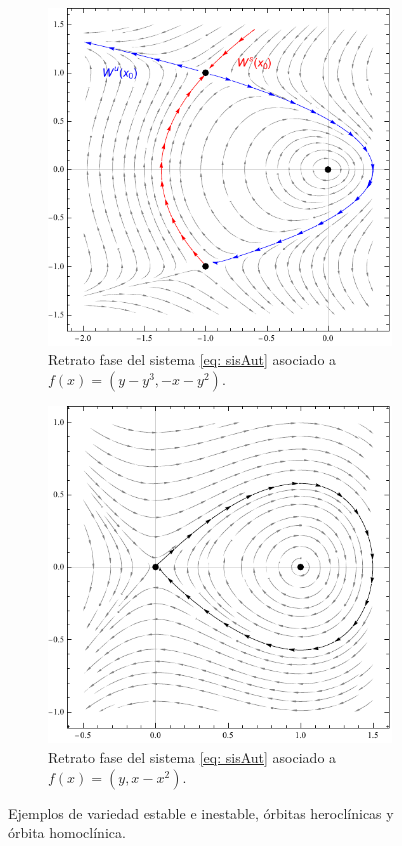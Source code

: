 \begin{figure} %
	\centering
	\begin{subfigure}{0.49\textwidth}
		\includegraphics[width=\textwidth]{img/Heteroclinic.pdf}
		\caption{Retrato fase del sistema \eqref{eq: sisAut} asociado a $f(x) = (y-y^3, -x-y^2)$.}
		\label{fig: heteroclinic}
	\end{subfigure}
	\hfill
	\begin{subfigure}{0.49\textwidth}
		\includegraphics[width=\textwidth]{img/Homoclinic.pdf}
		\caption{Retrato fase del sistema \eqref{eq: sisAut} asociado a $f(x) = (y, x-x^2)$.}
		\label{fig: homoclinic}
	\end{subfigure}
	\caption{Ejemplos de variedad estable e inestable, órbitas heroclínicas y órbita homoclínica.}
	\label{fig:comparacion}
\end{figure}

